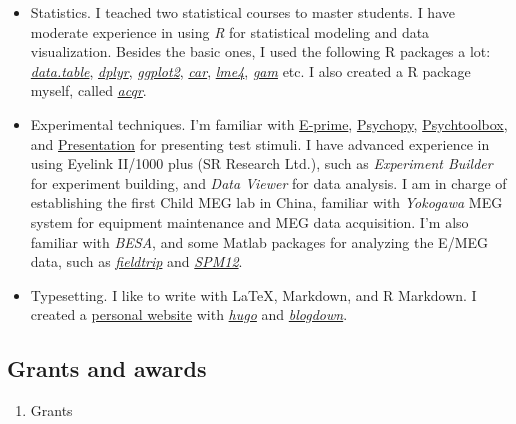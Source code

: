 \documentclass[10pt,]{article}
\providecommand{\tightlist}{%
  \setlength{\itemsep}{0pt}\setlength{\parskip}{0pt}}
\begin{document}
\begin{itemize}
\item
  Statistics. I teached two statistical courses to master students. I
  have moderate experience in using \emph{R} for statistical modeling
  and data visualization. Besides the basic ones, I used the following R
  packages a lot: \href{http://r-datatable.com}{\emph{data.table}},
  \href{http://dplyr.tidyverse.org}{\emph{dplyr}},
  \href{http://ggplot2.tidyverse.org}{\emph{ggplot2}},
  \href{https://cran.r-project.org/web/packages/car/index.html}{\emph{car}},
  \href{https://github.com/lme4/lme4}{\emph{lme4}},
  \href{https://cran.r-project.org/web/packages/gam/index.html}{\emph{gam}}
  etc. I also created a R package myself, called
  \href{https://github.com/likanzhan/acqr}{\emph{acqr}}.
\item
  Experimental techniques. I'm familiar with
  \href{https://www.pstnet.com/eprime.cfm}{E-prime},
  \href{http://www.psychopy.org}{Psychopy},
  \href{http://psychtoolbox.org}{Psychtoolbox}, and
  \href{https://www.neurobs.com/presentation}{Presentation} for
  presenting test stimuli. I have advanced experience in using Eyelink
  II/1000 plus (SR Research Ltd.), such as \emph{Experiment Builder} for
  experiment building, and \emph{Data Viewer} for data analysis. I am in
  charge of establishing the first Child MEG lab in China, familiar with
  \emph{Yokogawa} MEG system for equipment maintenance and MEG data
  acquisition. I'm also familiar with \emph{BESA}, and some Matlab
  packages for analyzing the E/MEG data, such as
  \href{http://www.fieldtriptoolbox.org}{\emph{fieldtrip}} and
  \href{https://github.com/neurodebian/spm12}{\emph{SPM12}}.
\item
  Typesetting. I like to write with LaTeX, Markdown, and R Markdown. I
  created a \href{https://likan.info}{personal website} with
  \href{https://gohugo.io}{\emph{hugo}} and
  \href{https://github.com/rstudio/blogdown}{\emph{blogdown}}.
\end{itemize}

\hypertarget{grants-and-awards}{%
\subsection{Grants and awards}\label{grants-and-awards}}

\begin{enumerate}
\def\labelenumi{\arabic{enumi}.}
\tightlist
\item
  Grants
\end{enumerate}
\end{document}

